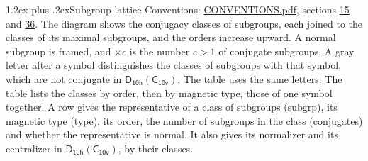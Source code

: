 \documentclass[10pt,a4paper]{article}
\makeatletter
\renewcommand\section{\@startsection{section}{1}{\z@}{-3ex plus -1ex minus -.2ex}%
  {1.2ex plus .2ex}{\normalfont\large\sffamily\bfseries\color{parttitle}}}
\numberwithin{equation}{section}
\newcommand{\grp}[1]{\mathsf{#1}}
\makeatother
\begin{document}
\section{Subgroup lattice}\label{s:subgroups}
Conventions: \href{../../CONVENTIONS.pdf}{CONVENTIONS.pdf}, sections \href{../../../rotation/CONVENTIONS.pdf\#conv.15}{15} and \href{../../CONVENTIONS.pdf\#conv.36}{36}.
The diagram shows the conjugacy classes of subgroups, each joined to the classes of its maximal subgroups, and the orders increase upward. \label{n:index.conjugates.c}\label{n:mark.conjugates}A normal subgroup is framed, and ${\times}c$ is the number $c > 1$ of conjugate subgroups. \label{n:mark.letter}A gray letter after a symbol distinguishes the classes of subgroups with that symbol, which are not conjugate in $\grp{D_{10h}}(\grp{C_{10v}})$. The table uses the same letters. The table lists the classes by order, then by magnetic type, those of one symbol together. \label{n:head.subgroup}\label{n:head.magnetic.type}\label{n:head.order}\label{n:head.conjugates}\label{n:head.normal}A row gives the representative of a class of subgroups (subgrp), its magnetic type (type), its order, the number of subgroups in the class (conjugates) and whether the representative is normal. \label{n:head.normalizer}\label{n:head.centralizer}It also gives its normalizer and its centralizer in $\grp{D_{10h}}(\grp{C_{10v}})$, by their classes. 
\end{document}
